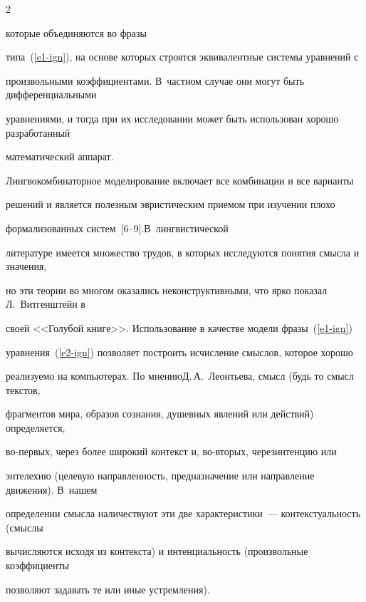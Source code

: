 \begin{multicols}{2}
\noindent 


 которые объединяются во фразы 


типа~(\ref{e1-ign}), на основе которых строятся эквивалентные сис\-те\-мы уравнений с 


произвольными коэффициентами. В~частном случае они могут быть дифференциальными 


уравнениями, и тогда при их исследовании может быть использован хорошо разработанный 


математический аппарат.








      Лингвокомбинаторное моделирование вклю\-чает все комбинации и все варианты 


решений и является полезным эвристическим при\-емом при изучении плохо 


формализованных сис\-тем~[6--9].\linebreak В~лингвистической 


литературе имеется множество трудов, в которых исследуются понятия смысла и значения, 


но эти теории во многом оказались неконструктивными, что ярко показал Л.~Витгенштейн в 


своей <<Голубой книге>>. Использование в качестве модели фразы~(\ref{e1-ign}) 


уравнения~(\ref{e2-ign}) поз\-во\-ля\-ет построить исчисление смыслов, которое хорошо 


реализуемо на компьютерах. По мнению\linebreak Д.\,А.~Леонтьева, смысл (будь то смысл текстов, 


фрагментов мира, образов сознания, душевных явлений или действий) определяется, 


      во-пер\-вых, через более широкий контекст и, во-вто\-рых, через\linebreak интенцию или 


энтелехию (целевую направленность, предназначение или направление движения). В~нашем 


определении смысла наличествуют эти две характеристики~--- контекстуальность (смыс\-лы 


вычисляются исходя из контекста) и интенциальность (произвольные коэффициенты 


позволяют задавать те или иные устремления).






\end{multicols}
